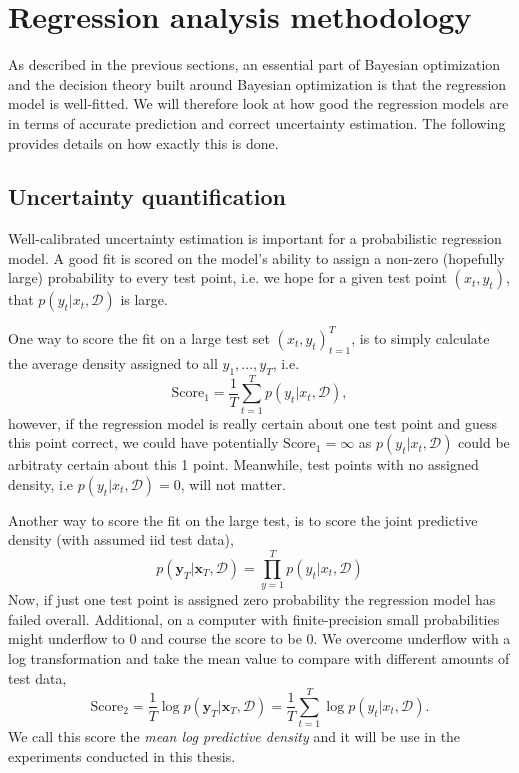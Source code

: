  
 
 

 \section{Regression analysis methodology}
 As described in the previous sections, an essential part of Bayesian optimization and the decision
 theory built around Bayesian optimization is that the regression model is well-fitted. We will therefore
 look at how good the regression models are in terms of accurate prediction and 
 correct uncertainty estimation. The following provides details on how exactly this is done. 

 \subsection{Uncertainty quantification}
Well-calibrated uncertainty estimation is important for a probabilistic regression model. A good fit is
scored on the model's ability to assign a non-zero (hopefully large) probability to every test point, i.e.
we hope for a given test point $(x_t, y_t)$, that $p(y_t|x_t,\mathcal{D})$ is large. 

One way to score the fit on a large test set $(x_t, y_t)_{t=1}^T$, is to simply calculate the average
density assigned to all $y_1, ..., y_T$, i.e. 
$$\text{Score}_1  = \frac{1}{T}\sum_{t=1}^T p(y_t|x_t,\mathcal{D}),$$ 
however, if the regression model is really certain about one test point and guess this point correct,  
we could have potentially $\text{Score}_1 = \infty$ as $ p(y_t|x_t,\mathcal{D})$ could be arbitraty certain about this 
1 point. Meanwhile, test points with no assigned density, i.e $p(y_t|x_t,\mathcal{D}) = 0$, will not matter. 

Another way to score the fit on the large test, is to score the joint predictive density (with assumed iid 
test data), 
$$p(\textbf{y}_T|\textbf{x}_T, \mathcal{D}) = \prod_{y=1}^T p(y_t|x_t, \mathcal{D})$$
Now, if just one test point is assigned zero probability the regression model has failed overall. 
Additional, on a computer with finite-precision small probabilities might underflow to 0 and course
the score to be 0. We overcome underflow with a log transformation and take the mean value to 
compare with different amounts of test data,
$$ \text{Score}_2 = \frac{1}{T} \log p(\textbf{y}_T|\textbf{x}_T, \mathcal{D}) = \frac{1}{T}\sum_{t=1}^T \log p(y_t|x_t, \mathcal{D}).$$
We call this score the \textit{mean log predictive density} and it will be use in the experiments conducted in this thesis. 

